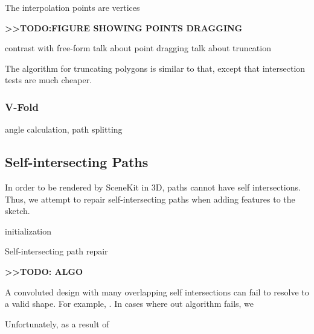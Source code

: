 The interpolation points are vertices

\textbf{\textgreater{}\textgreater{}TODO:FIGURE SHOWING POINTS DRAGGING}

contrast with free-form talk about point dragging talk about truncation

The algorithm for truncating polygons is similar to that, except that
intersection tests are much cheaper.

\subsubsection{V-Fold}\label{v-fold}

angle calculation, path splitting

\subsection{Self-intersecting Paths}\label{self-intersecting-paths}

In order to be rendered by SceneKit in 3D, paths cannot have self
intersections. Thus, we attempt to repair self-intersecting paths when
adding features to the sketch.

\begin{algorithm}[H]
 initialization\;
 \caption{Self-intersecting path repair}
\end{algorithm}

\textbf{\textgreater{}\textgreater{}TODO: ALGO}

A convoluted design with many overlapping self intersections can fail to
resolve to a valid shape. For example, . In cases where out algorithm
fails, we

Unfortunately, as a result of
